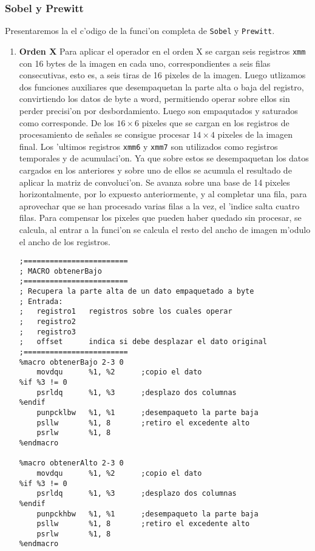 \documentclass[11pt]{article}
\begin{document}
\subsubsection{Sobel y Prewitt}
Presentaremos la el c'odigo de la funci'on completa de \verb'Sobel' y \verb'Prewitt'.
\begin{enumerate}
\item \textbf{Orden X}
\subitem Para aplicar el operador en el orden X se cargan seis registros \verb'xmm' con 16 bytes de la imagen en cada uno, correspondientes a seis filas consecutivas, esto es, a seis tiras de 16 pixeles de la imagen. Luego utlizamos dos funciones auxiliares que desempaquetan la parte alta o baja del registro, convirtiendo los datos de byte a word, permitiendo operar sobre ellos sin perder precisi'on por desbordamiento.  Luego son empaqutados y saturados como corresponde.  De los $16 \times 6$ pixeles que se cargan en los registros de procesamiento de se\~{n}ales se consigue procesar $14 \times 4$ pixeles de la imagen final.  Los 'ultimos registros \verb'xmm6' y \verb'xmm7' son utilizados como registros temporales y de acumulaci'on.  Ya que sobre estos se desempaquetan los datos cargados en los anteriores y sobre uno de ellos se acumula el resultado de aplicar la matriz de convoluci'on.  Se avanza sobre una base de 14 pixeles horizontalmente, por lo expuesto anteriormente, y al completar una fila, para aprovechar que se han procesado varias filas a la vez, el 'indice salta cuatro filas.  Para compensar los pixeles que pueden haber quedado sin procesar, se calcula, al entrar a la funci'on se calcula el resto del ancho de imagen m'odulo el ancho de los registros.

\begin{lstlisting}[frame=single]
;========================
; MACRO obtenerBajo
;========================
; Recupera la parte alta de un dato empaquetado a byte
; Entrada:
;	registro1	registros sobre los cuales operar 
;	registro2
;	registro3
;	offset		indica si debe desplazar el dato original
;========================
%macro obtenerBajo 2-3 0
	movdqu		%1, %2		;copio el dato
%if %3 != 0
	psrldq		%1, %3		;desplazo dos columnas
%endif
	punpcklbw	%1, %1		;desempaqueto la parte baja
	psllw		%1, 8		;retiro el excedente alto
	psrlw		%1, 8
%endmacro

%macro obtenerAlto 2-3 0
	movdqu		%1, %2		;copio el dato
%if %3 != 0
	psrldq		%1, %3		;desplazo dos columnas
%endif
	punpckhbw	%1, %1		;desempaqueto la parte baja
	psllw		%1, 8		;retiro el excedente alto
	psrlw		%1, 8
%endmacro      


\end{lstlisting}
\end{enumerate}
\end{document}
